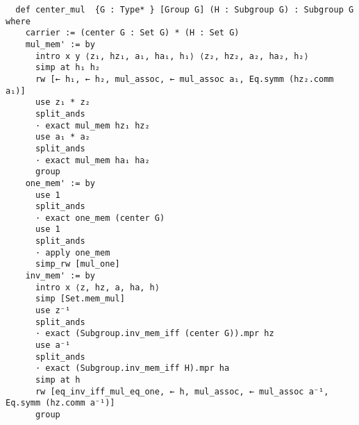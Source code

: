 \begin{footnotesize}
  \begin{verbatim}
  def center_mul  {G : Type* } [Group G] (H : Subgroup G) : Subgroup G where
    carrier := (center G : Set G) * (H : Set G)
    mul_mem' := by
      intro x y ⟨z₁, hz₁, a₁, ha₁, h₁⟩ ⟨z₂, hz₂, a₂, ha₂, h₂⟩
      simp at h₁ h₂
      rw [← h₁, ← h₂, mul_assoc, ← mul_assoc a₁, Eq.symm (hz₂.comm a₁)]
      use z₁ * z₂
      split_ands
      · exact mul_mem hz₁ hz₂
      use a₁ * a₂
      split_ands
      · exact mul_mem ha₁ ha₂
      group
    one_mem' := by
      use 1
      split_ands
      · exact one_mem (center G)
      use 1
      split_ands
      · apply one_mem
      simp_rw [mul_one]
    inv_mem' := by
      intro x ⟨z, hz, a, ha, h⟩
      simp [Set.mem_mul]
      use z⁻¹
      split_ands
      · exact (Subgroup.inv_mem_iff (center G)).mpr hz
      use a⁻¹
      split_ands
      · exact (Subgroup.inv_mem_iff H).mpr ha
      simp at h
      rw [eq_inv_iff_mul_eq_one, ← h, mul_assoc, ← mul_assoc a⁻¹, Eq.symm (hz.comm a⁻¹)]
      group
  \end{verbatim}
\end{footnotesize}


